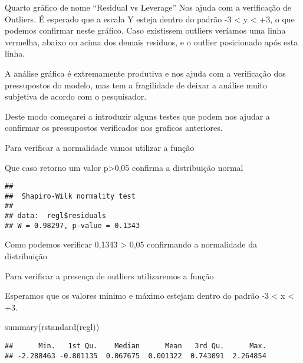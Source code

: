 \documentclass[
]{article}
\newenvironment{Shaded}{\begin{snugshade}}{\end{snugshade}}
\newcommand{\FunctionTok}[1]{\textcolor[rgb]{0.00,0.00,0.00}{#1}}
\newcommand{\NormalTok}[1]{#1}
\newcommand{\SpecialCharTok}[1]{\textcolor[rgb]{0.00,0.00,0.00}{#1}}
\begin{document}
Quarto gráfico de nome ``Residual vs Leverage'' Nos ajuda com a
verificação de Outliers. É esperado que a escala Y esteja dentro do
padrão -3 \textless{} y \textless{} +3, o que podemos confirmar neste
gráfico. Caso existissem outliers veríamos uma linha vermelha, abaixo ou
acima dos demais residuos, e o outlier posicionado após esta linha.

A análise gráfica é extremamente produtiva e nos ajuda com a verificação
dos pressupostos do modelo, mas tem a fragilidade de deixar a análise
muito subjetiva de acordo com o pesquisador.

Deste modo começarei a introduzir alguns testes que podem nos ajudar a
confirmar os pressupostos verificados nos graficos anteriores.

Para verificar a normalidade vamos utilizar a função

Que caso retorno um valor p\textgreater0,05 confirma a distribuição
normal

\begin{Shaded}
\end{Shaded}

\begin{verbatim}
## 
##  Shapiro-Wilk normality test
## 
## data:  regl$residuals
## W = 0.98297, p-value = 0.1343
\end{verbatim}

Como podemos verificar 0,1343 \textgreater{} 0,05 confirmando a
normalidade da distribuição

Para verificar a presença de outliers utilizaremos a função

Esperamos que os valores mínimo e máximo estejam dentro do padrão -3
\textless{} x \textless{} +3.

\begin{Shaded}
\begin{Highlighting}[]
\FunctionTok{summary}\NormalTok{(}\FunctionTok{rstandard}\NormalTok{(regl))                                                                          }
\end{Highlighting}
\end{Shaded}

\begin{verbatim}
##      Min.   1st Qu.    Median      Mean   3rd Qu.      Max. 
## -2.288463 -0.801135  0.067675  0.001322  0.743091  2.264854
\end{verbatim}
\end{document}
